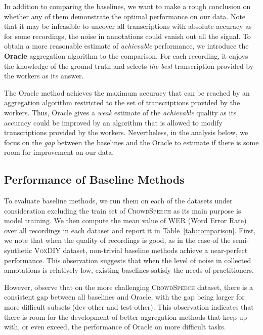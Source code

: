 \documentclass{article}
\newcommand{\speech}{\textsc{CrowdSpeech}}
\newcommand{\vox}{\textsc{VoxDIY}}
\begin{document}
In addition to comparing the baselines, we want to make a rough conclusion on whether any of them demonstrate the optimal performance on our data. Note that it may be infeasible to uncover all transcriptions with absolute accuracy as for some recordings, the noise in annotations could vanish out all the signal. To obtain a more reasonable estimate of \emph{achievable} performance, we introduce the \textbf{Oracle} aggregation algorithm to the comparison. For each recording, it enjoys the knowledge of the ground truth and selects \emph{the best} transcription provided by the workers as its answer. 

The Oracle method achieves the maximum accuracy that can be reached by an aggregation algorithm restricted to the set of transcriptions provided by the workers. Thus, Oracle gives a \emph{weak} estimate of the \emph{achievable} quality as its accuracy could be improved by an algorithm that is allowed to modify transcriptions provided by the workers. Nevertheless, in the analysis below, we focus on the \emph{gap} between the baselines and the Oracle to estimate if there is some room for improvement on our data.


\subsection{Performance of Baseline Methods}
\label{section:baseline_result}


To evaluate baseline methods, we run them on each of the datasets under consideration excluding the train set of \speech{} as its main purpose is model training. We then compute the mean value of WER (Word Error Rate) over all recordings in each dataset and report it in Table~\ref{tab:comparison}. First, we note that when the quality of recordings is good, as in the case of the semi-synthetic \vox{} dataset, non-trivial baseline methods achieve a near-perfect performance. This observation suggests that when the level of noise in collected annotations is relatively low, existing baselines satisfy the needs of practitioners.


However, observe that on the more challenging \speech{} dataset, there is a consistent gap between all baselines and Oracle, with the gap being larger for more difficult subsets (dev-other and test-other). This observation indicates that there is room for the development of better aggregation methods that keep up with, or even exceed, the performance of Oracle on more difficult tasks.
\end{document}
